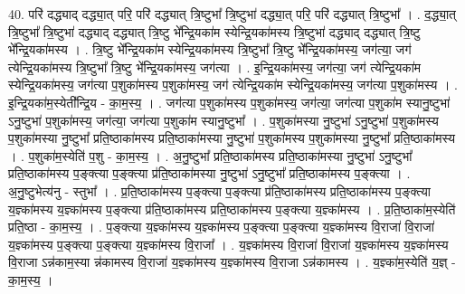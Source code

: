 \documentclass[17pt]{extarticle}
\begin{document}
40. परि॑ दद्ध्याद् दद्ध्या॒त् परि॒ परि॑ दद्ध्यात् त्रि॒ष्टुभा᳚ त्रि॒ष्टुभा॑ दद्ध्या॒त् परि॒ परि॑ दद्ध्यात् त्रि॒ष्टुभा᳚ । . द॒द्ध्या॒त् त्रि॒ष्टुभा᳚ त्रि॒ष्टुभा॑ दद्ध्याद् दद्ध्यात् त्रि॒ष्टु भे᳚न्द्रि॒यका॑म स्येन्द्रि॒यका॑मस्य त्रि॒ष्टुभा॑ दद्ध्याद् दद्ध्यात् त्रि॒ष्टु भे᳚न्द्रि॒यका॑मस्य । . त्रि॒ष्टु भे᳚न्द्रि॒यका॑म स्येन्द्रि॒यका॑मस्य त्रि॒ष्टुभा᳚ त्रि॒ष्टु भे᳚न्द्रि॒यका॑मस्य॒ जग॑त्या॒ जग॑
त्येन्द्रि॒यका॑मस्य त्रि॒ष्टुभा᳚ त्रि॒ष्टु भे᳚न्द्रि॒यका॑मस्य॒ जग॑त्या । . इ॒न्द्रि॒यका॑मस्य॒ जग॑त्या॒ जग॑ त्येन्द्रि॒यका॑म स्येन्द्रि॒यका॑मस्य॒ जग॑त्या प॒शुका॑मस्य प॒शुका॑मस्य॒ जग॑ त्येन्द्रि॒यका॑म स्येन्द्रि॒यका॑मस्य॒ जग॑त्या प॒शुका॑मस्य । . इ॒न्द्रि॒यका॑म॒स्येती᳚न्द्रि॒य - का॒म॒स्य॒ । . जग॑त्या प॒शुका॑मस्य प॒शुका॑मस्य॒ जग॑त्या॒ जग॑त्या प॒शुका॑म स्यानु॒ष्टुभा॑ ऽनु॒ष्टुभा॑ प॒शुका॑मस्य॒ जग॑त्या॒ जग॑त्या प॒शुका॑म स्यानु॒ष्टुभा᳚ । . प॒शुका॑मस्या नु॒ष्टुभा॑ ऽनु॒ष्टुभा॑ प॒शुका॑मस्य प॒शुका॑मस्या नु॒ष्टुभा᳚ प्रति॒ष्ठाका॑मस्य प्रति॒ष्ठाका॑मस्या नु॒ष्टुभा॑ प॒शुका॑मस्य प॒शुका॑मस्या नु॒ष्टुभा᳚ प्रति॒ष्ठाका॑मस्य । . प॒शुका॑म॒स्येति॑ प॒शु - का॒म॒स्य॒ । . अ॒नु॒ष्टुभा᳚ प्रति॒ष्ठाका॑मस्य प्रति॒ष्ठाका॑मस्या नु॒ष्टुभा॑ ऽनु॒ष्टुभा᳚ प्रति॒ष्ठाका॑मस्य प॒ङ्क्त्या प॒ङ्क्त्या प्र॑ति॒ष्ठाका॑मस्या नु॒ष्टुभा॑ ऽनु॒ष्टुभा᳚ प्रति॒ष्ठाका॑मस्य प॒ङ्क्त्या । . अ॒नु॒ष्टुभेत्य॑नु - स्तुभा᳚ । . प्र॒ति॒ष्ठाका॑मस्य प॒ङ्क्त्या प॒ङ्क्त्या प्र॑ति॒ष्ठाका॑मस्य प्रति॒ष्ठाका॑मस्य प॒ङ्क्त्या य॒ज्ञ्का॑मस्य य॒ज्ञ्का॑मस्य प॒ङ्क्त्या प्र॑ति॒ष्ठाका॑मस्य प्रति॒ष्ठाका॑मस्य प॒ङ्क्त्या य॒ज्ञ्का॑मस्य । . प्र॒ति॒ष्ठाका॑म॒स्येति॑ प्रति॒ष्ठा - का॒म॒स्य॒ । . प॒ङ्क्त्या य॒ज्ञ्का॑मस्य य॒ज्ञ्का॑मस्य प॒ङ्क्त्या प॒ङ्क्त्या य॒ज्ञ्का॑मस्य वि॒राजा॑ वि॒राजा॑ य॒ज्ञ्का॑मस्य प॒ङ्क्त्या प॒ङ्क्त्या य॒ज्ञ्का॑मस्य वि॒राजा᳚ । . य॒ज्ञ्का॑मस्य वि॒राजा॑ वि॒राजा॑ य॒ज्ञ्का॑मस्य य॒ज्ञ्का॑मस्य वि॒राजा ऽन्न॑काम॒स्या न्न॑कामस्य वि॒राजा॑ य॒ज्ञ्का॑मस्य य॒ज्ञ्का॑मस्य वि॒राजा ऽन्न॑कामस्य । . य॒ज्ञ्का॑म॒स्येति॑ य॒ज्ञ् - का॒म॒स्य॒ । \newline
\end{document}
